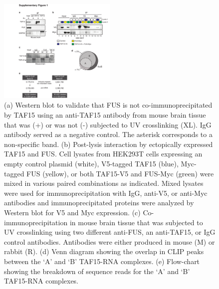 \begin{figure}[ht]
  \centering
  \includegraphics[width=0.5\textwidth]{chapter_2_figures/Figure_S1}
  \caption[Supplementary Figure 1. CLIP-seq for TAF15 in the mouse brain]{(a) Western blot to validate that FUS is not co-immunoprecipitated by TAF15 using an anti-TAF15 antibody from mouse brain tissue that was (+) or was not (-) subjected to UV crosslinking (XL). IgG antibody served as a negative control. The asterisk corresponds to a non-specific band. (b) Post-lysis interaction by ectopically expressed TAF15 and FUS. Cell lysates from HEK293T cells expressing an empty control plasmid (white), V5-tagged TAF15 (blue), Myc-tagged FUS (yellow), or both TAF15-V5 and FUS-Myc (green) were mixed in various paired combinations as indicated. Mixed lysates were used for immunoprecipitation with IgG, anti-V5, or anti-Myc antibodies and immunoprecipitated proteins were analyzed by Western blot for V5 and Myc expression. (c) Co-immunoprecipitation in mouse brain tissue that was subjected to UV crosslinking using two different anti-FUS, an anti-TAF15, or IgG control antibodies. Antibodies were either produced in mouse (M) or rabbit (R). (d) Venn diagram showing the overlap in CLIP peaks between the ‘A’ and ‘B’ TAF15-RNA complexes. (e) Flow-chart showing the breakdown of sequence reads for the ‘A’ and ‘B’ TAF15-RNA complexes.}
  \label{fig:Figure_S1}
\end{figure}

